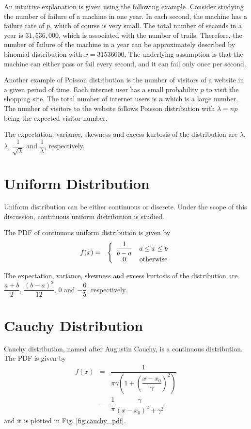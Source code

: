 An intuitive explanation is given using the following example. Consider studying the number of failure of a machine in one year. In each second, the machine has a failure rate of $p$, which of course is very small. The total number of seconds in a year is $31,536,000$, which is associated with the number of trails. Therefore, the number of failure of the machine in a year can be approximately described by binomial distribution with $x=31536000$. The underlying assumption is that the machine can either pass or fail every second, and it can fail only once per second.

Another example of Poisson distribution is the number of visitors of a website in a given period of time. Each internet user has a small probability $p$ to visit the shopping site. The total number of internet users is $n$ which is a large number. The number of visitors to the website follows Poisson distribution with $\lambda=np$ being the expected visitor number.

The expectation, variance, skewness and excess kurtosis of the distribution are $\lambda$, $\lambda$, $\dfrac{1}{\sqrt{\lambda}}$ and $\dfrac{1}{\lambda}$, respectively.

\section{Uniform Distribution}

Uniform distribution can be either continuous or discrete. Under the scope of this discussion, continuous uniform distribution is studied.

The PDF of continuous uniform distribution is given by
\begin{eqnarray}
  f(x) &=& \left\{\begin{array}{cc}
                    \dfrac{1}{b-a} & a \leq x \leq b \\
                    0 & \textup{otherwise}
                  \end{array}\right. \nonumber
\end{eqnarray}

The expectation, variance, skewness and excess kurtosis of the distribution are $\dfrac{a+b}{2}$, $\dfrac{(b-a)^2}{12}$, $0$ and $-\dfrac{6}{5}$, respectively.

\section{Cauchy Distribution}

Cauchy distribution, named after Augustin Cauchy, is a continuous distribution. The PDF is given by
\begin{eqnarray}
  f(x) &=& \dfrac{1}{\pi\gamma\left(1+\left(\dfrac{x-x_0}{\gamma}\right)^2\right)} \nonumber \\ &=& \dfrac{1}{\pi}\dfrac{\gamma}{(x-x_0)^2+\gamma^2} \nonumber
\end{eqnarray}
and it is plotted in Fig. \ref{fig:cauchy_pdf}.

